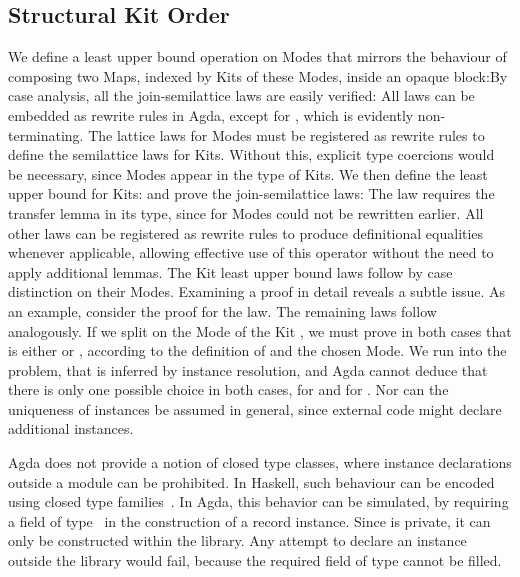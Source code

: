 \documentclass[screen,nonacm]{acmart}
\begin{document}
\subsection{Structural Kit Order}\label{sec:ags-sko}
We define a least upper bound operation on Modes that mirrors the behaviour of
composing two Maps, indexed by Kits of these Modes, inside an opaque
block:\AModeLub{}By case analysis, all the join-semilattice laws are easily
verified: \AModeLubLaws{}All laws can be embedded as rewrite rules in Agda,
except for , which is evidently non-terminating. The
lattice laws for Modes must be registered as rewrite rules to define the
semilattice laws for Kits. Without this, explicit type coercions would be
necessary, since Modes appear in the type of Kits. We then define the least
upper bound for Kits: \AKitLub{}and prove the join-semilattice laws:
\AKitLubLaws{}The  law requires the transfer lemma in its
type, since  for Modes could not be rewritten earlier. All
other laws can be registered as rewrite rules to produce definitional
equalities whenever applicable, allowing effective use of this operator without
the need to apply additional lemmas. The Kit least upper bound laws follow by
case distinction on their Modes. Examining a proof in detail reveals a subtle
issue. As an example, consider the proof for the  law. The
remaining laws follow analogously. \AKitLubExcerpt{}If we split on the Mode
 of the Kit , we must prove in both cases that
 is either  or , according to the
definition of  and the chosen Mode. We run into the
problem, that  is inferred by instance resolution, and Agda cannot
deduce that there is only one possible choice in both cases, 
for  and  for
. Nor can the uniqueness of instances be assumed
in general, since external code might declare additional instances.

Agda does not provide a notion of closed type classes, where instance
declarations outside a module can be prohibited. In Haskell, such behaviour can
be encoded using closed type families~\cite{10.1145/2578855.2535856}. In Agda,
this behavior can be simulated, by requiring a field \ALockField{} of type
\ALock\ in the construction of a record instance. Since  is
private, it can only be constructed within the library. Any attempt to declare
an instance outside the library would fail, because the required field
 of type  cannot be filled.
\end{document}
